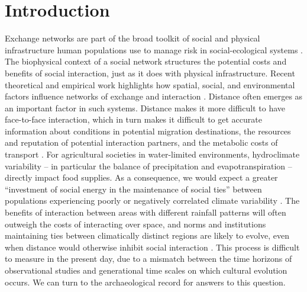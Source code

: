 \documentclass[10pt]{iopart}
\begin{document}
\section*{Introduction}
Exchange networks are part of the broad toolkit of social and physical infrastructure human populations use to manage risk in social-ecological systems \parencite{Anderies2015}. The biophysical context of a social network structures the potential costs and benefits of social interaction, just as it does with physical infrastructure. Recent theoretical and empirical work highlights how spatial, social, and environmental factors influence networks of exchange and interaction \parencite{Fafchamps2007,Bloch2008,Nolin2010,Verdery2012,Freeman2014,Koster2014,Hao2015a,Schnegg2015}. Distance often emerges as an important factor in such systems. Distance makes it more difficult to have face-to-face interaction, which in turn makes it difficult to get accurate information about conditions in potential migration destinations, the resources and reputation of potential interaction partners, and the metabolic costs of transport \parencite{ostrom, Fafchamps2007, Anderies2011a, Drennan1984}. For agricultural societies in water-limited environments, hydroclimate variability -- in particular the balance of precipitation and evapotranspiration -- directly impact food supplies. As a consequence, we would expect a greater ``investment of social energy in the maintenance of social ties'' between populations experiencing poorly or negatively correlated climate variability \parencite{Rautman1993a}. The benefits of interaction between areas with different rainfall patterns will often outweigh the costs of interacting over space, and norms and institutions maintaining ties between climatically distinct regions are likely to evolve, even when distance would otherwise inhibit social interaction \parencite{Durante2009}. This process is difficult to measure in the present day, due to a mismatch between the time horizons of observational studies and generational time scales on which cultural evolution occurs. We can turn to the archaeological record for answers to this question. 
\end{document}
